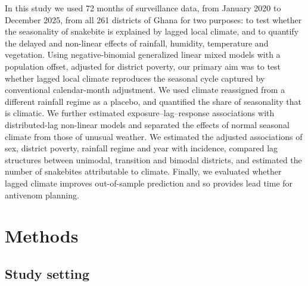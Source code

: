 \documentclass[11pt,a4paper]{article}
\begin{document}
In this study we used 72 months of surveillance data, from January 2020 to December 2025, from all 261 districts of Ghana for two purposes: to test whether the seasonality of snakebite is explained by lagged local climate, and to quantify the delayed and non-linear effects of rainfall, humidity, temperature and vegetation. Using negative-binomial generalized linear mixed models with a population offset, adjusted for district poverty, our primary aim was to test whether lagged local climate reproduces the seasonal cycle captured by conventional calendar-month adjustment. We used climate reassigned from a different rainfall regime as a placebo, and quantified the share of seasonality that is climatic. We further estimated exposure--lag--response associations with distributed-lag non-linear models and separated the effects of normal seasonal climate from those of unusual weather. We estimated the adjusted associations of sex, district poverty, rainfall regime and year with incidence, compared lag structures between unimodal, transition and bimodal districts, and estimated the number of snakebites attributable to climate. Finally, we evaluated whether lagged climate improves out-of-sample prediction and so provides lead time for antivenom planning.

\section{Methods}

\subsection{Study setting}
\end{document}
